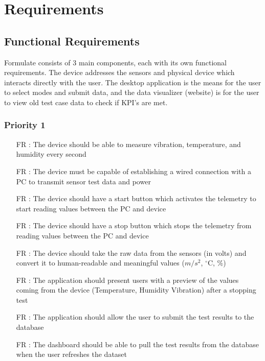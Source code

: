 \documentclass[12pt,titlepage]{article}
\newcounter{reqnum} %
\begin{document}
  \newpage

\section{Requirements}

\subsection{Functional Requirements}
Formulate consists of 3 main components, each with its own functional requirements. The device addresses the sensors and physical device which interacts directly with the user. The desktop application is the means for the user to select modes and submit data, and the data visualizer (website) is for the user to view old test case data to check if KPI's are met.



\subsubsection{Priority 1} 

\begin{itemize}
  
  \item[FR \refstepcounter{reqnum}\thereqnum:] The device should be able to measure vibration, temperature, and humidity every second
  
  \item[FR \refstepcounter{reqnum}\thereqnum:] The device must be capable of establishing a wired connection with a PC to transmit sensor test data and power
  
  \item[FR \refstepcounter{reqnum}\thereqnum:] The device should have a start button which activates the telemetry to start reading values between the PC and device 
  
  \item[FR \refstepcounter{reqnum}\thereqnum:] The device should have a stop button which stops the telemetry from reading values between the PC and device
  
  \item[FR \refstepcounter{reqnum}\thereqnum:] The device should take the raw data from the sensors (in volts) and convert it to human-readable and meaningful values ($m/s^2$, $^\circ$C, \%)
  
  \item[FR \refstepcounter{reqnum}\thereqnum:] The application should present users with a preview of the values coming from the device (Temperature, Humidity Vibration) after a stopping test

  \item[FR \refstepcounter{reqnum}\thereqnum:] The application should allow the user to submit the test results to the database
  
  \item[FR \refstepcounter{reqnum}\thereqnum:] The dashboard should be able to pull the test results from the database when the user refreshes the dataset
  
  \end{itemize}
\end{document}
